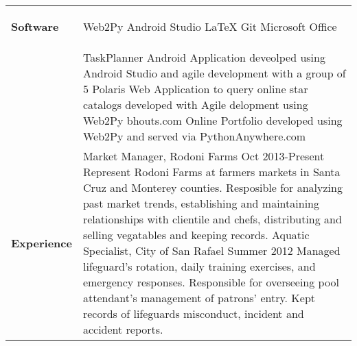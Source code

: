 \documentclass[11pt]{article}
\begin{document}
\begin{tabular}{p{3.3cm}  p{13cm}}
\\
\textbf{Software}  & \vspace{-7.7mm}
	\begin{multicols}{2}
				Web2Py \newline
				Android Studio \newline
				\LaTeX \newline
				Git \newline
				Microsoft Office 
	\end{multicols}
\\
\color{blue}{\textbf{Projects}}  & \vspace{0mm}
		TaskPlanner \hspace{3.51mm} \normalsize 
			Android Application deveolped using Android Studio \hspace*{4.08cm} and agile development 				with a group of 5 \newline\Large
		Polaris \hspace{1.7cm} \normalsize
			Web Application to query online star catalogs developed \hspace*{4.08cm}with Agile 								delopment using Web2Py \newline\Large
		bhouts.com \hspace{7mm} \normalsize 
			Online Portfolio developed using Web2Py and served via \hspace*{4.08cm}												PythonAnywhere.com\newline\Large
			
\\
\vspace{-1cm}

\textbf{Experience}  &  \vspace{-1cm}
Market Manager, Rodoni Farms \hspace{3cm}\normalsize Oct 2013-Present\newline\normalsize 
Represent Rodoni Farms at farmers markets in Santa Cruz and Monterey counties. Resposible for analyzing past market trends, establishing and maintaining relationships with clientile and chefs, distributing and selling vegatables and keeping records.
 \Large \vspace{2mm}
\newline 
Aquatic Specialist, City of San Rafael \hspace{2.2cm} \normalsize Summer 2012\newline\normalsize
Managed lifeguard’s rotation, daily training exercises, and emergency responses. Responsible for overseeing pool attendant’s management of patrons’ entry. Kept records of lifeguards misconduct, incident and accident reports.




\end{tabular}
\end{document}
